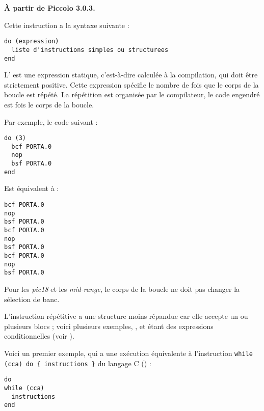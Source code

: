 \textbf{À partir de Piccolo 3.0.3.}


Cette instruction a la syntaxe suivante :
\begin{lstlisting}[language=piccolo]
do (expression)
  liste d'instructions simples ou structurees
end
\end{lstlisting}

L' est une expression statique, c'est-à-dire calculée à la compilation, qui doit être strictement positive. Cette expression spécifie le nombre de fois que le corps de la boucle est répété. La répétition est organisée par le compilateur, le code engendré est  fois le corps de la boucle.

Par exemple, le code suivant :
\begin{lstlisting}[language=piccolo]
do (3)
  bcf PORTA.0
  nop
  bsf PORTA.0
end
\end{lstlisting}

Est équivalent à :
\begin{lstlisting}[language=piccolo]
bcf PORTA.0
nop
bsf PORTA.0
bcf PORTA.0
nop
bsf PORTA.0
bcf PORTA.0
nop
bsf PORTA.0
\end{lstlisting}


Pour les \emph{pic18} et les \emph{mid-range}, le corps de la boucle ne doit pas changer la sélection de banc.










L'instruction répétitive a une structure moins répandue car elle accepte un ou plusieurs blocs  ; voici plusieurs exemples, ,  et  étant des expressions conditionnelles (voir ).


Voici un premier exemple, qui a une exécution équivalente à l'instruction \texttt{while (cca) do \{ instructions \}} du langage C () :
\begin{lstlisting}[language=piccolo]
do
while (cca)
  instructions
end
\end{lstlisting}


